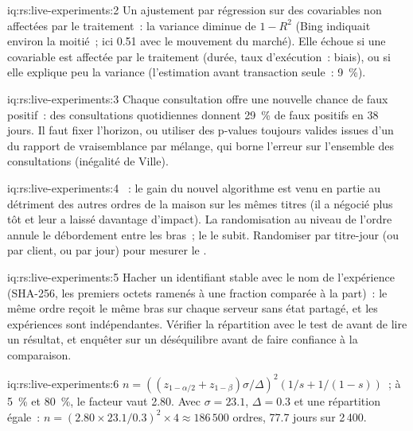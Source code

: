 \begin{solution}{iq:rs:live-experiments:2}
Un ajustement par régression sur des covariables non affectées par le traitement~: la variance diminue de $1 - R^2$ (Bing indiquait environ la moitié~; ici 0.51 avec le mouvement du marché).
Elle échoue si une covariable est affectée par le traitement (durée, taux d'exécution~: biais), ou si elle explique peu la variance (l'estimation avant transaction seule~: 9~\%).
\end{solution}

\begin{solution}{iq:rs:live-experiments:3}
Chaque consultation offre une nouvelle chance de faux positif~: des consultations quotidiennes donnent 29~\% de faux positifs en 38 jours. Il faut fixer l'horizon, ou utiliser des p-values toujours valides issues d'un
 du rapport de vraisemblance par mélange, qui borne l'erreur sur l'ensemble des consultations (inégalité de Ville).
\end{solution}

\begin{solution}{iq:rs:live-experiments:4}
~: le gain du nouvel algorithme est venu en partie au détriment des autres ordres de la maison sur les mêmes titres (il a négocié plus tôt et leur a laissé davantage d'impact).
La randomisation au niveau de l'ordre annule le débordement entre les bras~; le  le subit. Randomiser par titre-jour (ou par client, ou par jour) pour mesurer le .
\end{solution}

\begin{solution}{iq:rs:live-experiments:5}
Hacher un identifiant stable avec le nom de l'expérience (SHA-256, les premiers octets ramenés à une fraction comparée à la part)~: le même ordre reçoit le même bras sur chaque serveur
sans état partagé, et les expériences sont indépendantes. Vérifier la répartition avec le test de  avant de lire un résultat, et enquêter sur un
déséquilibre avant de faire confiance à la comparaison.
\end{solution}

\begin{solution}{iq:rs:live-experiments:6}
$n = ((z_{1-\alpha/2} + z_{1-\beta})\sigma/\Delta)^2 (1/s + 1/(1-s))$~; à 5~\% et 80~\%, le facteur vaut 2.80. Avec $\sigma = 23.1$, $\Delta = 0.3$ et une
répartition égale~: $n = (2.80 \times 23.1/0.3)^2 \times 4 \approx 186\,500$ ordres, 77.7 jours sur 2\,400.
\end{solution}
